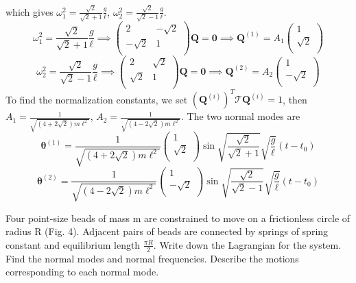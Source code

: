 \documentclass[a4paper]{article}
\begin{document}
\begin{ans}
which gives $\omega_1^2=\frac{\sqrt{2}}{\sqrt{2}+1}\frac{g}{\ell}$, $\omega_2^2=\frac{\sqrt{2}}{\sqrt{2}-1}\frac{g}{\ell}$.
$$\omega_1^2=\frac{\sqrt{2}}{\sqrt{2}+1}\frac{g}{\ell}\implies\begin{pmatrix}2&-\sqrt{2}\\-\sqrt{2}&1\\\end{pmatrix}\mathbf{Q}=\boldsymbol{0}\implies\mathbf{Q}^{(1)}=A_1\begin{pmatrix}1\\\sqrt{2}\\\end{pmatrix}$$
$$\omega_2^2=\frac{\sqrt{2}}{\sqrt{2}-1}\frac{g}{\ell}\implies\begin{pmatrix}2&\sqrt{2}\\\sqrt{2}&1\\\end{pmatrix}\mathbf{Q}=\boldsymbol{0}\implies\mathbf{Q}^{(2)}=A_2\begin{pmatrix}1\\-\sqrt{2}\\\end{pmatrix}$$
To find the normalization constants, we set $(\mathbf{Q}^{(i)})^T\mathcal{T}\mathbf{Q}^{(i)}=1$, then $A_1=\frac{1}{\sqrt{(4+2\sqrt{2})m\ell^2}}$, $A_2=\frac{1}{\sqrt{(4-2\sqrt{2})m\ell^2}}$. The two normal modes are
$$\boldsymbol{\theta}^{(1)}=\frac{1}{\sqrt{(4+2\sqrt{2})m\ell^2}}\begin{pmatrix}1\\\sqrt{2}\\\end{pmatrix}\sin\sqrt{\frac{\sqrt{2}}{\sqrt{2}+1}}\sqrt{\frac{g}{\ell}}(t-t_0)$$
$$\boldsymbol{\theta}^{(2)}=\frac{1}{\sqrt{(4-2\sqrt{2})m\ell^2}}\begin{pmatrix}1\\-\sqrt{2}\\\end{pmatrix}\sin\sqrt{\frac{\sqrt{2}}{\sqrt{2}-1}}\sqrt{\frac{g}{\ell}}(t-t_0)$$
\end{ans}
\newpage
\begin{qns}
Four point-size beads of mass m are constrained to move on a frictionless circle of radius R (Fig. 4). Adjacent pairs of beads are connected by springs of spring constant and equilibrium length $\frac{\pi R}{2}$. Write down the Lagrangian for the system. Find the normal modes and normal frequencies. Describe the motions corresponding to each normal mode.
\end{qns}
\end{document}

